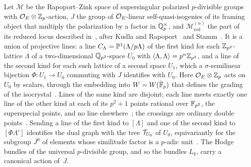 Let $\mathcal M$ be the Rapoport--Zink space of supersingular polarized $p$-divisible groups with $\mathcal{O}_E\otimes\mathbb{Z}_p$-action,
$J$ the group of $\mathcal{O}_E$-linear self-quasi-isogenies of its framing object that multiply the polarization by a factor in
$\mathbb{Q}_p^\times$, and $\mathcal M^{(n)}_{\mathrm{red}}$ the part of its reduced
locus described in~\cite[Section~6.3]{Luck2026}, after Kudla and Rapoport~\cite[Section~4]{KudlaRapoport1999} and
Stamm~\cite{Stamm1997}. It is a union of projective lines: a line $C_\Lambda=\mathbb{P}^1(\Lambda/p\Lambda)$ of the first kind for
each $\mathbb{Z}_{p^2}$-lattice $\Lambda$ of a two-dimensional $\mathbb{Q}_{p^2}$-space $U_0$ with $\langle\Lambda,\Lambda\rangle=p^n\mathbb{Z}_{p^2}$,
and a line of the second kind for each such lattice of a second space $U_1$, which a $\sigma$-semilinear bijection
$\Phi\colon U_1\to U_0$ commuting with $J$ identifies with $U_0$. Here $\mathcal{O}_E\otimes\mathbb{Z}_p$ acts on $U_0$ by scalars,
through the embedding into $W=W(\bar{\mathbb{F}}_p)$ that defines the grading of the isocrystal~\cite[(4.3)]{KudlaRapoport1999}.
Lines of the same kind are disjoint; each line meets
exactly one line of the other kind at each of its $p^2+1$ points rational over $\mathbb{F}_{p^2}$, the superspecial points, and no
line elsewhere~\cite[Lemma~4.3(iii), the text after~(4.9) and Proposition~4.4]{KudlaRapoport1999}; the crossings are ordinary double
points~\cite[Theorem~6.1]{BachmatGoren1999}. Sending a line of the first kind to $[\Lambda]$ and one of the second kind to
$[\Phi\Lambda']$ identifies the dual graph with the tree $\mathcal{T}_{U_0}$ of $U_0$, equivariantly for the subgroup $J^0$ of
elements whose similitude factor is a $p$-adic unit~\cite[Section~6.3]{Luck2026}. The Hodge bundles of the universal
$p$-divisible group, and so the bundles $L_k$, carry a canonical action of~$J$.

